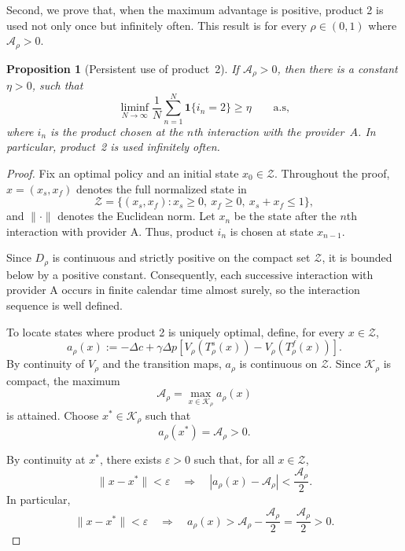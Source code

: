 \documentclass[11pt]{article}
\newcommand{\Ind}[1]{\mathbf 1\{#1\}}
\newtheorem{proposition}{Proposition}
\begin{document}
Second, we prove that, when the maximum advantage is positive, product 2 is used not only once but infinitely often. This result is for every $\rho \in (0,1)$ where $\mathcal A_\rho>0$. 


\begin{proposition}[Persistent use of product~2]
\label{prop:persistence}
If $\mathcal A_\rho>0$, then there is a constant
$\eta>0$, such that
\begin{equation}
\liminf_{N\to\infty}\frac1N\sum_{n=1}^{N}\Ind{i_n=2}\geq\eta
\qquad\text{a.s},
\end{equation}
where $i_n$ is the product chosen at the $n$th interaction with the provider~$A$.
In particular, product~2 is used infinitely often.
\end{proposition}

\begin{proof}
Fix an optimal policy and an initial state $x_0\in\mathcal Z$.
Throughout the proof, $x=(x_s,x_f)$ denotes the full normalized
state in
\begin{equation*}
\mathcal Z=\{(x_s,x_f):x_s\ge0,\ x_f\ge0,\ x_s+x_f\le1\},
\end{equation*}
and $\|\cdot\|$ denotes the Euclidean norm.
Let $x_n$ be the state after the $n$th interaction with provider A.
Thus, product $i_n$ is chosen at state $x_{n-1}$.

Since $D_\rho$ is continuous and strictly positive on the compact
set $\mathcal Z$, it is bounded below by a positive constant.
Consequently, each successive interaction with provider A occurs
in finite calendar time almost surely, so the interaction sequence
is well defined.

To locate states where product 2 is uniquely optimal, define,
for every $x\in\mathcal Z$,
\begin{equation*}
a_\rho(x)
:=-\Delta c+\gamma\Delta p
\left[
V_\rho(T_\rho^s(x))-V_\rho(T_\rho^f(x))
\right].
\end{equation*}
By continuity of $V_\rho$ and the transition maps,
$a_\rho$ is continuous on $\mathcal Z$.
Since $\mathcal K_\rho$ is compact, the maximum
\begin{equation*}
\mathcal A_\rho
=\max_{x\in\mathcal K_\rho}a_\rho(x)
\end{equation*}
is attained. Choose $x^*\in\mathcal K_\rho$ such that
\begin{equation*}
a_\rho(x^*)=\mathcal A_\rho>0.
\end{equation*}

By continuity at $x^*$, there exists $\varepsilon>0$ such that,
for all $x\in\mathcal Z$,
\begin{equation*}
\|x-x^*\|<\varepsilon
\quad\Longrightarrow\quad
|a_\rho(x)-\mathcal A_\rho|
<\frac{\mathcal A_\rho}{2}.
\end{equation*}
In particular,
\begin{equation}
\label{eq:pers-neighborhood}
\|x-x^*\|<\varepsilon
\quad\Longrightarrow\quad
a_\rho(x)>
\mathcal A_\rho-\frac{\mathcal A_\rho}{2}
=\frac{\mathcal A_\rho}{2}>0.
\end{equation}


\end{proof}
\end{document}
